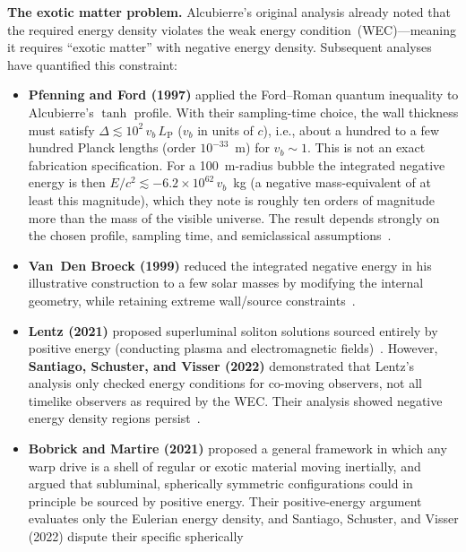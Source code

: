 \documentclass[aps,prd,twocolumn,superscriptaddress,nofootinbib,floatfix]{revtex4-2}
\begin{document}
\textbf{The exotic matter problem.} Alcubierre's original analysis already noted
that the required energy density violates the weak energy condition~(WEC)---meaning
it requires ``exotic matter'' with negative energy density. Subsequent analyses
have quantified this constraint:
\begin{itemize}
  \item \textbf{Pfenning and Ford (1997)} applied the Ford--Roman quantum
        inequality to Alcubierre's $\tanh$ profile. With their sampling-time
        choice, the wall thickness must satisfy
        $\Delta \lesssim 10^{2}\,v_{b}\,L_{\mathrm{P}}$ ($v_{b}$ in units of $c$),
        i.e., about a hundred to a few hundred Planck lengths (order
        $10^{-33}$~m) for $v_{b}\sim1$. This is not an exact fabrication
        specification. For a \SI{100}{m}-radius bubble the integrated negative
        energy is then $E/c^{2} \lesssim -6.2\times10^{62}\,v_{b}$~kg (a negative
        mass-equivalent of at least this magnitude),
        which they note is roughly ten orders of magnitude more than the mass of
        the visible universe. The result depends strongly on the chosen profile,
        sampling time, and semiclassical
        assumptions~\cite{PfenningFord1997}.
  \item \textbf{Van~Den Broeck (1999)} reduced the integrated negative energy in
        his illustrative construction to a few solar masses by modifying the
        internal geometry, while retaining extreme wall/source
        constraints~\cite{VanDenBroeck1999}.
  \item \textbf{Lentz (2021)} proposed superluminal soliton solutions sourced
        entirely by positive energy (conducting plasma and electromagnetic
        fields)~\cite{Lentz2021}. However, \textbf{Santiago, Schuster, and Visser
        (2022)} demonstrated that Lentz's analysis only checked energy conditions
        for co-moving observers, not all timelike observers as required by the
        WEC. Their analysis showed negative energy density regions
        persist~\cite{SantiagoVisser2022}.
  \item \textbf{Bobrick and Martire (2021)} proposed a general framework in which
        any warp drive is a shell of regular or exotic material moving
        inertially, and argued that subluminal, spherically symmetric
        configurations could in principle be sourced by positive energy. Their
        positive-energy argument evaluates only the Eulerian energy density, and
        Santiago, Schuster, and Visser (2022) dispute their specific spherically

\end{itemize}
\end{document}
